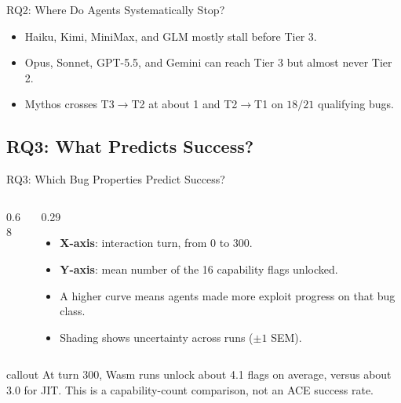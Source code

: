 \documentclass[aspectratio=169,t]{beamer}
\newcommand{\callout}[1]{%
  \vspace{0.45em}%
  \begin{beamercolorbox}[wd=\linewidth,sep=0.55em,rounded=false]{callout}
    #1
  \end{beamercolorbox}%
  \vspace{0.35em}%
}
\begin{document}
\begin{frame}{RQ2: Where Do Agents Systematically Stop?}
  \begin{itemize}
    \item Haiku, Kimi, MiniMax, and GLM mostly stall before Tier 3.
    \item Opus, Sonnet, GPT-5.5, and Gemini can reach Tier 3 but almost never Tier 2.
    \item Mythos crosses T3$\to$T2 at about 1 and T2$\to$T1 on $18/21$ qualifying bugs.
  \end{itemize}
\end{frame}

\subsection{RQ3: What Predicts Success?}

\begin{frame}{RQ3: Which Bug Properties Predict Success?}
  \blackfiguretop
  \begin{columns}[T,onlytextwidth]
    \begin{column}{0.68\textwidth}
      \centering
    \end{column}
    \hfill
    \begin{column}{0.29\textwidth}
      \begin{itemize}\small
        \item \textbf{X-axis}: interaction turn, from 0 to 300.
        \item \textbf{Y-axis}: mean number of the 16 capability flags unlocked.
        \item A higher curve means agents made more exploit progress on that bug class.
        \item Shading shows uncertainty across runs ($\pm1$ SEM).
      \end{itemize}
    \end{column}
  \end{columns}

  \callout{At turn 300, Wasm runs unlock about 4.1 flags on average, versus about 3.0 for JIT. This is a capability-count comparison, not an ACE success rate.}
\end{frame}
\end{document}
